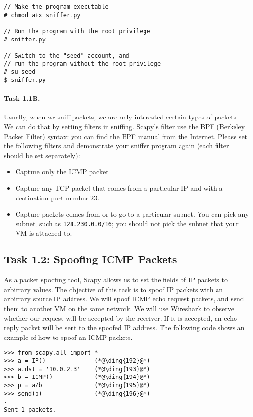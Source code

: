 \begin{lstlisting}
// Make the program executable 
# chmod a+x sniffer.py

// Run the program with the root privilege
# sniffer.py

// Switch to the "seed" account, and
// run the program without the root privilege
# su seed
$ sniffer.py
\end{lstlisting}


\paragraph{Task 1.1B.} Usually, when we sniff packets, we are only
interested certain types of packets. We can do that by setting 
filters in sniffing. Scapy's filter use the 
BPF (Berkeley Packet Filter) syntax; you can find the BPF manual 
from the Internet. Please set the following filters and demonstrate 
your sniffer program again (each filter should be set separately):

\begin{itemize} 
 \item Capture only the ICMP packet
 \item Capture any TCP packet that comes from a particular IP and with 
 a destination port number 23. 
 \item Capture packets comes from or to go to a particular subnet. You can
 pick any subnet, such as \texttt{128.230.0.0/16}; you should not 
 pick the subnet that your VM is attached to. 
\end{itemize} 



\subsection{Task 1.2: Spoofing ICMP Packets}

As a packet spoofing tool, Scapy allows us to set the fields of 
IP packets to arbitrary values. The objective of this 
task is to spoof IP packets with an arbitrary source IP address. 
We will spoof ICMP echo request packets, and send them to another VM on
the same network. We will use Wireshark to observe
whether our request will be accepted by the receiver. If it is accepted, an
echo reply packet will be sent to the spoofed IP address. 
The following code shows an example of how to spoof an ICMP packets.


\begin{lstlisting}
>>> from scapy.all import *
>>> a = IP()              (*@\ding{192}@*)
>>> a.dst = '10.0.2.3'    (*@\ding{193}@*)
>>> b = ICMP()            (*@\ding{194}@*)
>>> p = a/b               (*@\ding{195}@*)
>>> send(p)               (*@\ding{196}@*)
.
Sent 1 packets.
\end{lstlisting}
 

